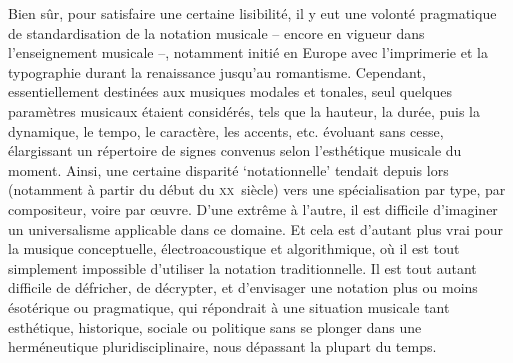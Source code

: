 \documentclass{article}
\begin{document}
Bien sûr, pour satisfaire une certaine lisibilité, il y eut une volonté pragmatique de standardisation de la notation musicale -- encore en vigueur dans l'enseignement musicale --, notamment initié en Europe avec l'imprimerie et la typographie durant la renaissance jusqu'au romantisme. Cependant, essentiellement destinées aux musiques modales et tonales, seul quelques paramètres musicaux étaient considérés, tels que la hauteur, la durée, puis la dynamique, le tempo, le caractère, les accents, etc. évoluant sans cesse, élargissant un répertoire de signes convenus selon l'esthétique musicale du moment.  
Ainsi, une certaine disparité `notationnelle' tendait depuis lors (notamment à partir du début du  \textsc{xx}\ieme ~siècle) vers une  spécialisation par type, par compositeur, voire par œuvre.
D'une extrême à l'autre, il est difficile d'imaginer un universalisme applicable dans ce domaine. Et cela est d'autant plus vrai pour la musique conceptuelle, électroacoustique et algorithmique, où il est tout simplement impossible d'utiliser la notation traditionnelle. Il est tout autant difficile de défricher, de décrypter, et d'envisager une notation plus ou moins ésotérique ou pragmatique, qui répondrait à une situation musicale tant esthétique, historique, sociale ou politique sans se plonger dans une herméneutique pluridisciplinaire, nous dépassant la plupart du temps.

\end{document}
